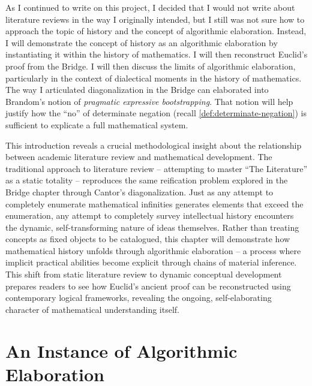 \documentclass[12pt]{book}
\begin{document}
As I continued to write on this project, I decided that I would not write about literature reviews in the way I originally intended, but I still was not sure how to approach the topic of history and the concept of algorithmic elaboration. Instead, I will demonstrate the concept of history as an algorithmic elaboration by instantiating it within the history of mathematics. I will then reconstruct Euclid's proof from the Bridge. I will then discuss the limits of algorithmic elaboration, particularly in the context of dialectical moments in the history of mathematics. The way I articulated diagonalization in the Bridge can elaborated into Brandom's notion of \textit{pragmatic expressive bootstrapping}. That notion will help justify how the ``no'' of determinate negation (recall \ref{def:determinate-negation}) is sufficient to explicate a full mathematical system.

This introduction reveals a crucial methodological insight about the relationship between academic literature review and mathematical development. The traditional approach to literature review -- attempting to master ``The Literature'' as a static totality -- reproduces the same reification problem explored in the Bridge chapter through Cantor's diagonalization. Just as any attempt to completely enumerate mathematical infinities generates elements that exceed the enumeration, any attempt to completely survey intellectual history encounters the dynamic, self-transforming nature of ideas themselves. Rather than treating concepts as fixed objects to be catalogued, this chapter will demonstrate how mathematical history unfolds through algorithmic elaboration -- a process where implicit practical abilities become explicit through chains of material inference. This shift from static literature review to dynamic conceptual development prepares readers to see how Euclid's ancient proof can be reconstructed using contemporary logical frameworks, revealing the ongoing, self-elaborating character of mathematical understanding itself. 




\section{An Instance of Algorithmic Elaboration}
\end{document}
